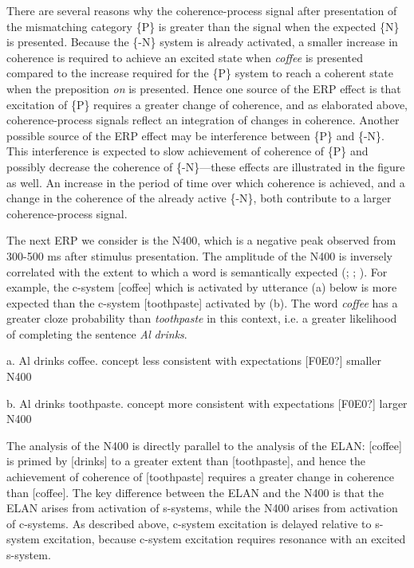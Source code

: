 There are several reasons why the coherence-process signal after presentation of the mismatching category \{P\} is greater than the signal when the expected \{N\} is presented. Because the \{-N\} system is already activated, a smaller increase in coherence is required to achieve an excited state when \textit{coffee} is presented compared to the increase required for the \{P\} system to reach a coherent state when the preposition \textit{on} is presented. Hence one source of the ERP effect is that excitation of \{P\} requires a greater change of coherence, and as elaborated above, coherence-process signals reflect an integration of changes in coherence. Another possible source of the ERP effect may be interference between \{P\} and \{-N\}. This interference is expected to slow achievement of coherence of \{P\} and possibly decrease the coherence of \{-N\}—these effects are illustrated in the figure as well. An increase in the period of time over which coherence is achieved, and a change in the coherence of the already active \{-N\}, both contribute to a larger coherence-process signal.

  The next ERP we consider is the N400, which is a negative peak observed from 300-500 ms after stimulus presentation. The amplitude of the N400 is inversely correlated with the extent to which a word is semantically expected (\citealt{FedermeierLaszlo2009}; \citealt{Friederici2002}; \citealt{KutasFedermeier2011}). For example, the c-system [coffee] which is activated by utterance (a) below is more expected than the c-system [toothpaste] activated by (b). The word \textit{coffee} has a greater cloze probability than \textit{toothpaste} in this context, i.e. a greater likelihood of completing the sentence \textit{Al} \textit{drinks}.

a. Al drinks coffee.         concept less consistent with expectations [F0E0?] smaller N400

b. Al drinks toothpaste.    concept more consistent with expectations [F0E0?] larger N400

The analysis of the N400 is directly parallel to the analysis of the ELAN: [coffee] is primed by [drinks] to a greater extent than [toothpaste], and hence the achievement of coherence of [toothpaste] requires a greater change in coherence than [coffee]. The key difference between the ELAN and the N400 is that the ELAN arises from activation of s-systems, while the N400 arises from activation of c-systems. As described above, c-system excitation is delayed relative to s-system excitation, because c-system excitation requires resonance with an excited s-system.

